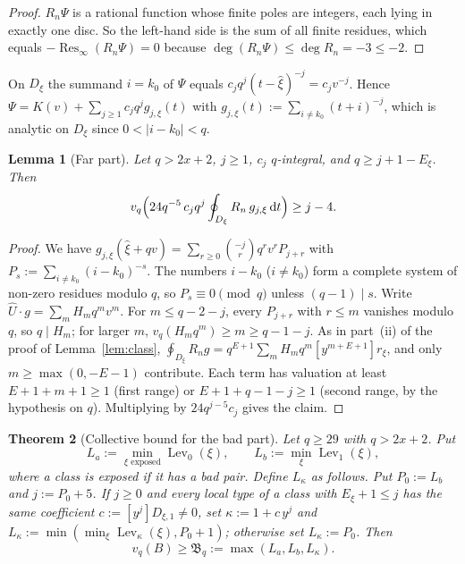 \documentclass{amsart}
\newtheorem{theorem}{Theorem}[section]
\newtheorem{lemma}[theorem]{Lemma}
\theoremstyle{definition}
\theoremstyle{remark}
\numberwithin{equation}{section}
\newcommand{\Res}{\operatorname{Res}}
\newcommand{\Lev}{\operatorname{Lev}}
\newcommand{\dd}{\,\mathrm{d}}
\begin{document}
\begin{proof}
$R_n\Psi$ is a rational function whose finite poles are integers, each lying
in exactly one disc. So the left-hand side is the sum of all finite residues,
which equals $-\Res_\infty(R_n\Psi)=0$ because
$\deg(R_n\Psi)\le\deg R_n=-3\le-2$.
\end{proof}

On $D_\xi$ the summand $i=k_0$ of $\Psi$ equals $c_jq^j(t-\hat\xi)^{-j}=c_jv^{-j}$.
Hence $\Psi=K(v)+\sum_{j\ge1}c_jq^jg_{j,\xi}(t)$ with
$g_{j,\xi}(t):=\sum_{i\ne k_0}(t+i)^{-j}$, which is analytic on $D_\xi$ since
$0<|i-k_0|<q$.

\begin{lemma}[Far part]\label{lem:farpart}
Let $q>2x+2$, $j\ge1$, $c_j$ $q$-integral, and $q\ge j+1-E_\xi$. Then
\[
  v_q\Bigl(24q^{-5}\,c_jq^j\oint_{D_\xi}R_n\,g_{j,\xi}\dd t\Bigr)\ge j-4 .
\]
\end{lemma}

\begin{proof}
We have $g_{j,\xi}(\hat\xi+qv)=\sum_{r\ge0}\binom{-j}rq^rv^rP_{j+r}$ with
$P_s:=\sum_{i\ne k_0}(i-k_0)^{-s}$. The numbers $i-k_0$ ($i\ne k_0$) form a
complete system of non-zero residues modulo $q$, so $P_s\equiv0\pmod q$ unless
$(q-1)\mid s$. Write $\hat U\cdot g=\sum_mH_mq^mv^m$. For $m\le q-2-j$,
every $P_{j+r}$ with $r\le m$ vanishes modulo $q$, so $q\mid H_m$; for larger
$m$, $v_q(H_mq^m)\ge m\ge q-1-j$. As in part~(ii) of the proof of
Lemma~\ref{lem:class}, $\oint_{D_\xi}R_ng=q^{E+1}\sum_mH_mq^m[y^{m+E+1}]r_\xi$,
and only $m\ge\max(0,-E-1)$ contribute. Each term has valuation at least
$E+1+m+1\ge1$ (first range) or $E+1+q-1-j\ge1$ (second range, by the
hypothesis on $q$). Multiplying by $24q^{j-5}c_j$ gives the claim.
\end{proof}

\begin{theorem}[Collective bound for the bad part]\label{thm:collective}
Let $q\ge29$ with $q>2x+2$. Put
\[
  L_a:=\min_{\xi\text{ exposed}}\Lev_0(\xi),\qquad L_b:=\min_\xi\Lev_1(\xi),
\]
where a class is \emph{exposed} if it has a bad pair. Define $L_\kappa$ as
follows. Put $P_0:=L_b$ and $j:=P_0+5$. If $j\ge0$ and every local type of a
class with $E_\xi+1\le j$ has the same coefficient
$c:=[y^j]D_{\xi,1}\ne0$, set $\kappa:=1+c\,y^j$ and
$L_\kappa:=\min(\min_\xi\Lev_\kappa(\xi),P_0+1)$; otherwise set
$L_\kappa:=P_0$. Then
\[
  v_q(B)\ge\mathfrak B_q:=\max(L_a,L_b,L_\kappa).
\]
\end{theorem}
\end{document}
